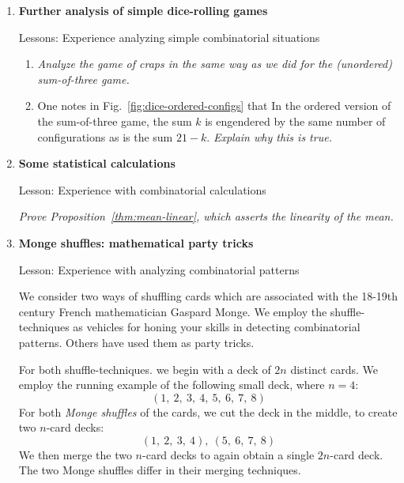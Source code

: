 \begin{enumerate}

\medskip\item
{\bf Further analysis of simple dice-rolling games}

{\sc Lessons:} Experience analyzing simple combinatorial situations

\smallskip

  \begin{enumerate}
  \item
{\em Analyze the game of craps in the same way as we did for the (unordered) sum-of-three game.}

  \medskip\item
One notes in Fig.~\ref{fig:dice-ordered-configs} that In the ordered version of the sum-of-three game, the sum $k$ is engendered by the same number of configurations as is the sum $21 - k$.  
{\em Explain why this is true.}
  \end{enumerate}
  

\smallskip
\medskip\item
{\bf Some statistical calculations}

{\sc Lesson:} Experience with combinatorial calculations

\smallskip
  
{\em Prove Proposition~\ref{thm:mean-linear}, which asserts the linearity of the mean.}


\medskip\item
{\bf Monge shuffles: mathematical party tricks}

{\sc Lesson:} Experience with analyzing combinatorial patterns

\smallskip

 

We consider two ways of shuffling cards which are associated with the 18-19th century French mathematician Gaspard Monge.  We employ the shuffle-techniques as vehicles for honing your skills in detecting combinatorial patterns.  Others have used them as party tricks.

\smallskip

For both shuffle-techniques. we begin with a deck of $2n$ distinct cards.  We employ the running example of the following small deck, where $n=4$:
\[ (1, \ 2, \ 3, \ 4, \ 5, \ 6, \ 7, \ 8) \]
For both {\it Monge shuffles} of the cards, we cut the deck in the middle, to create two $n$-card decks:
\[ (1, \ 2, \ 3, \ 4), \ (5, \ 6, \ 7, \ 8) \]
We then merge the two $n$-card decks to again obtain a single $2n$-card deck.  The two Monge shuffles differ in their merging techniques.


\end{enumerate}
